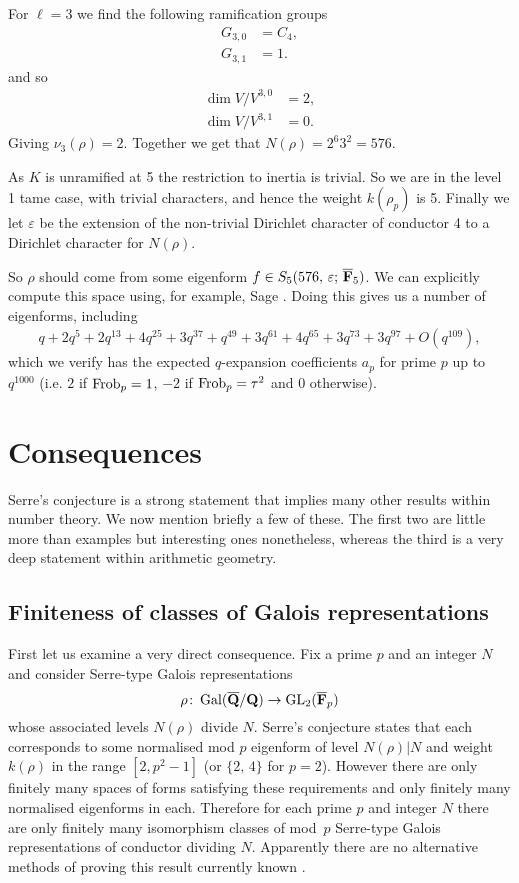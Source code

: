 \documentclass[a4paper,12pt]{article}
\begin{document}
\begin{ex}
For $\ell = 3$ we find the following ramification groups
\begin{align*}
G_{3,0}&= C_4,\\
G_{3,1}&= 1.
\end{align*}
and so
\begin{align*}
\dim V/V^{3,0} &= 2,\\
\dim V/V^{3,1} &= 0.
\end{align*}
Giving $\nu_3(\rho) = 2$.
Together we get that $N(\rho) = 2^{6}3^{2} = 576$.

As $K$ is unramified at 5 the restriction to inertia is trivial.
So we are in the level 1 tame case, with trivial characters, and hence the weight $k(\rho_p)$ is 5.
Finally we let $\varepsilon$ be the extension of the non-trivial Dirichlet character of conductor 4 to a Dirichlet character for $N(\rho)$.

So $\rho$ should come from some eigenform $f \in S_5(576,\,\varepsilon;\,\overline{\mathbf{F}}_5)$.
We can explicitly compute this space using, for example, Sage \cite{Sage}.
Doing this gives us a number of eigenforms, including
\begin{multline*}
q + 2q^{5} + 2q^{13} + 4q^{25} + 3q^{37} + q^{49} + 3q^{61} + 4q^{65} + 3q^{73} + 3q^{97} + O(q^{109}),
\end{multline*}
which we verify has the expected $q$-expansion coefficients $a_p$ for prime $p$ up to $q^{1000}$ (i.e. $2$ if $\operatorname{Frob}_p= 1$, $-2$ if $\operatorname{Frob}_p = \tau^2$ and $0$ otherwise).

\end{ex}


\section{Consequences}
Serre's conjecture is a strong statement that implies many other results within number theory.
We now mention briefly a few of these.
The first two are little more than examples but interesting ones nonetheless, whereas the third is a very deep statement within arithmetic geometry.

\subsection{Finiteness of classes of Galois representations}
First let us examine a very direct consequence.
Fix a prime $p$ and an integer $N$ and consider Serre-type Galois representations
\[
\rho\colon \operatorname{Gal}(\overline{\mathbf{Q}}/\mathbf{Q}) \to \operatorname{GL}_2(\overline{\mathbf{F}}_p)
\]
whose associated levels $N(\rho)$ divide $N$.
Serre's conjecture states that each corresponds to some normalised mod $p$ eigenform of level $N(\rho)|N$ and weight $k(\rho)$ in the range $[2,p^2-1]$ (or $\{2,\,4\}$ for $p=2$).
However there are only finitely many spaces of forms satisfying these requirements and only finitely many normalised eigenforms in each.
Therefore for each prime $p$ and integer $N$ there are only finitely many isomorphism classes of mod~$p$ Serre-type Galois representations of conductor dividing $N$.
Apparently there are no alternative methods of proving this result currently known \cite{WieseMod}.
\end{document}
